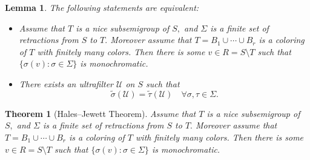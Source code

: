 \documentclass[10pt,a4paper]{amsart}
\newtheorem{lemma}{Lemma}
\newtheorem{theorem}{Theorem}
\begin{document}
\begin{lemma}\label{Lemma2}
The following statements are equivalent:

\begin{itemize}
    \item[(a)] Assume that $T$ is a nice subsemigroup of $S,$ and $\Sigma$ is a finite set of retractions from $S$ to $T.$ Moreover assume that $T=B_1 \cup \cdots \cup B_r$ is a coloring of $T$ with finitely many colors. Then there is some $v \in R=S \setminus T$ such that $\{\sigma(v) : \sigma \in \Sigma\}$ is monochromatic. 

   \item [(b)]There exists an ultrafilter $\mathcal{U}$ on $S$ such that
\[
\widetilde{\sigma}(\mathcal{U}) =\widetilde{\tau}(\mathcal{U}) \quad \forall \sigma,\tau \in \Sigma.
\]

\end{itemize}
\end{lemma}

\begin{theorem}[Hales--Jewett Theorem]
Assume that $T$ is a nice subsemigroup of $S,$ and $\Sigma$ is a finite set of retractions from $S$ to $T.$ Moreover assume that $T=B_1 \cup \cdots \cup B_r$ is a coloring of $T$ with finitely many colors. Then there is some $v \in R=S \setminus T$ such that $\{\sigma(v) : \sigma \in \Sigma\}$ is monochromatic.
\end{theorem}
\end{document}

